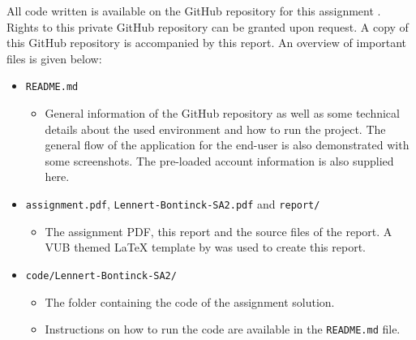 All code written is available on the GitHub repository for this assignment \citep{github_project}. 
Rights to this private GitHub repository can be granted upon request. 
A copy of this GitHub repository is accompanied by this report.
An overview of important files is given below:
\begin{itemize}
    \item \texttt{README.md}
    \begin{itemize}
        \item General information of the GitHub repository as well as some technical details about the used environment and how to run the project. The general flow of the application for the end-user is also demonstrated with some screenshots. The pre-loaded account information is also supplied here.
    \end{itemize}
    \item \texttt{assignment.pdf}, \texttt{Lennert-Bontinck-SA2.pdf} and \texttt{report/}
    \begin{itemize}
        \item The assignment PDF, this report and the source files of the report. A VUB themed \LaTeX{} template by \citet{latex_template} was used to create this report.
    \end{itemize}
    \item \texttt{code/Lennert-Bontinck-SA2/}
    \begin{itemize}
        \item The folder containing the code of the assignment solution.
        \item Instructions on how to run the code are available in the \texttt{README.md} file.
    \end{itemize}
\end{itemize}